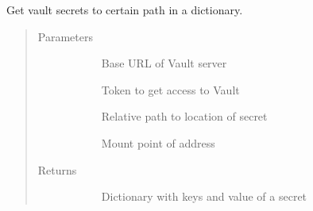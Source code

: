 \documentclass[letterpaper,10pt,english]{sphinxmanual}
\begin{document}
\begin{fulllineitems}
\label{\detokenize{autoapi/src/utils/vault/index:src.utils.vault.get_vault_secret}}
Get vault secrets to certain path in a dictionary.
\begin{quote}\begin{description}
\item[{Parameters}] \leavevmode\begin{description}
\item[{}] \leavevmode{[}\sphinxhref{https://docs.python.org/3/library/stdtypes.html\#str}{\sphinxcode{\sphinxupquote{str}}}{]}
Base URL of Vault server

\item[{}] \leavevmode{[}\sphinxhref{https://docs.python.org/3/library/stdtypes.html\#str}{\sphinxcode{\sphinxupquote{str}}}{]}
Token to get access to Vault

\item[{}] \leavevmode{[}\sphinxhref{https://docs.python.org/3/library/stdtypes.html\#str}{\sphinxcode{\sphinxupquote{str}}}{]}
Relative path to location of secret

\item[{}] \leavevmode{[}\sphinxhref{https://docs.python.org/3/library/stdtypes.html\#str}{\sphinxcode{\sphinxupquote{str}}}{]}
Mount point of address

\end{description}

\item[{Returns}] \leavevmode\begin{description}
\item[{}] \leavevmode
Dictionary with keys and value of a secret

\end{description}

\end{description}\end{quote}

\end{fulllineitems}
\end{document}
